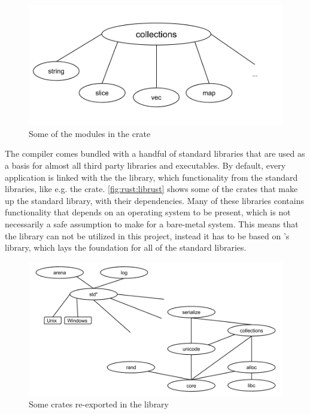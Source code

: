 \begin{figure}[H]
  \begin{center}
    \includegraphics[scale=0.3]{figures/background/rust/libcollections.png}
  \end{center}
  \caption{Some of the modules in the  crate}
  \label{fig:rust:collections}
\end{figure}

The \rust compiler comes bundled with a handful of standard libraries that are used as a basis for almost all third party libraries and executables.
By default, every \rust application is linked with the the \rust \std library, which  functionality from the standard libraries, like e.g. the  crate.
\autoref{fig:rust:librust} shows some of the crates that make up the standard library, with their dependencies.
Many of these libraries contains functionality that depends on an operating system to be present, which is not necessarily a safe assumption to make for a bare-metal system.
This means that the \std library can not be utilized in this project, instead it has to be based on \rust's \core library, which lays the foundation for all of the standard libraries.

\begin{figure}[H]
  \begin{center}
    \includegraphics[scale=0.3]{figures/background/rust/rust-lib.png}
  \end{center}
  \caption{Some crates re-exported in the \std library}
  \label{fig:rust:librust}
\end{figure}

